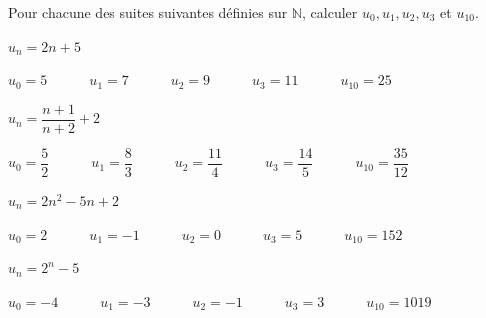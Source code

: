 \documentclass[12pt,a4paper]{article}  %
\begin{document}
Pour chacune des suites suivantes définies sur $\mathbb{N}$, calculer $u_{0}, u_{1}, u_{2}, u_{3}$ et $u_{10}$.
\begin{enumMet}
    \item {} $u_{n}=2 n+5$\\
    \begin{corrBox}
        $u_0=5\quad\quad\quad u_1=7\quad\quad\quad u_2=9\quad\quad\quad u_3=11\quad\quad\quad u_{10}=25$
    \end{corrBox}
    \item $u_{n}=\dfrac{n+1}{n+2}+2$\\
    \begin{corrBox}
        $u_0=\dfrac{5}{2}\quad\quad\quad u_1=\dfrac{8}{3}\quad\quad\quad u_2=\dfrac{11}{4}\quad\quad\quad u_3=\dfrac{14}{5}\quad\quad\quad u_{10}=\dfrac{35}{12}$
    \end{corrBox}
    \item $u_{n}=2n^{2}-5 n+2$\\
    \begin{corrBox}
        $u_0=2\quad\quad\quad u_1=-1\quad\quad\quad u_2=0\quad\quad\quad u_3=5\quad\quad\quad u_{10}=152$
    \end{corrBox}
    \item $u_{n}=2^{n}-5$\\
    \begin{corrBox}
        $u_0=-4\quad\quad\quad u_1=-3\quad\quad\quad u_2=-1\quad\quad\quad u_3=3\quad\quad\quad u_{10}=1019$
    \end{corrBox}
\end{enumMet}  
\end{document}

